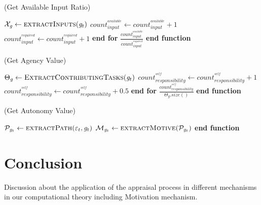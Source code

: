 \documentclass[letterpaper]{article}
\begin{document}
\begin{algorithm}
	\caption{(Get Available Input Ratio)}
	\label{array-sum}
	\begin{algorithmic}[1]
			\Statex
			\State $\mathcal{X}_{\mathit{g}} \gets
			\Call{extractInputs}{\mathit{g}_t}$
			\Statex
					\State $count_{input}^{^{available}} \gets count_{input}^{^{available}} + 1$
				\EndIf
				\Statex
				\State $count_{input}^{^{required}} \gets count_{input}^{^{required}} + 1$
			\EndFor \State \textbf{end for}
			\Statex
			\State \Return
			$\frac{count_{input}^{^{available}}}{count_{input}^{^{required}}}$
		\EndFunction 
	\State \textbf{end function}
	\end{algorithmic}
\end{algorithm}

\begin{algorithm}
	\caption{(Get Agency Value)}
	\label{array-sum}
	\begin{algorithmic}[1]
			\Statex
			\State $\Theta_{\mathit{g}} \gets
			\Call{ExtractContributingTasks}{\mathit{g}_t}$
			\Statex
					\State $count_{responsibility}^{^{self}} \gets count_{responsibility}^{^{self}} + 1$
				\Statex
					\State $count_{responsibility}^{^{self}} \gets
				count_{responsibility}^{^{self}} + 0.5$
				\EndIf
			\EndFor \State \textbf{end for}
			\Statex
			\State \Return 
			$\frac{count_{responsibility}^{^{self}}}{{\Theta_{\mathit{g}}}.size()}$
		\EndFunction 
	\State \textbf{end function}
	\end{algorithmic}
\end{algorithm}

\begin{algorithm}
	\caption{(Get Autonomy Value)}
	\label{array-sum}
	\begin{algorithmic}[1]
			\Statex
			\State $\mathcal{P}_{\mathit{g}_{t}} \gets \Call{extractPath}{\varepsilon_t,
			\mathit{g}_{t}}$
			\State $\mathcal{M}_{\mathit{g}_{t}} \gets
			\Call{extractMotive}{\mathcal{P}_{\mathit{g}_{t}}}$
			\Statex
					\State {}
				 \State {}
				\EndIf
			\Else
				\State {}
			\EndIf
		\EndFunction 
	\State \textbf{end function}
	\end{algorithmic}
\end{algorithm}

\section{Conclusion}

Discussion about the application of the appraisal process in different
mechanisms in our computational theory including Motivation mechanism. 



\end{document}
